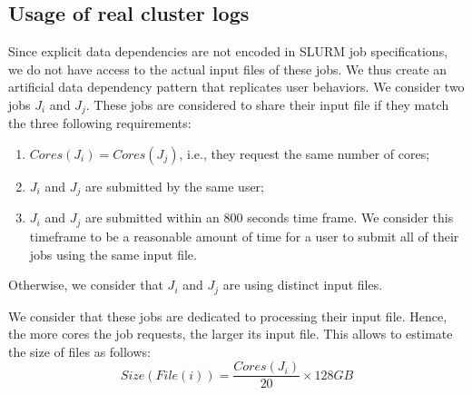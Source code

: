 \documentclass[sigconf,review,anonymous]{acmart}
\newcommand{\rev}[1]{{\color{black}{#1}}}
\newcommand{\file}{\ensuremath{\mathit{File}}\xspace}
\newcommand{\size}{\ensuremath{\mathit{Size}}\xspace}
\newcommand{\core}{\mathit{Cores}\xspace}
\begin{document}
\subsection{Usage of real cluster logs}
\label{sec.working}
\rev{The logs we use contain historical data on jobs, namely their
 exact submission time, their requested walltime, their actual duration, the number of cores they required and the corresponding user's name. 
}
%
Since explicit data dependencies are not encoded in SLURM job
specifications, we do not have access to the actual input files of
these jobs. We thus create an artificial data dependency pattern that
replicates user behaviors.
\rev{Each job uses exactly one input file.}
We consider two jobs $J_i$ and $J_j$. These jobs are considered to
share their input file if they match the three following requirements:
\begin{enumerate}
	\item $\core(J_i) = \core(J_j)$, i.e., they request the same number of cores;
	\item $J_i$ and $J_j$ are submitted by the same user;
	\item $J_i$ and $J_j$ are submitted within an 800 seconds
          time frame. We consider this timeframe to be a reasonable amount of time for a user to submit all of their jobs using the same input file.
\end{enumerate}
Otherwise, we consider that $J_i$ and $J_j$ are using distinct input files. 
\rev{
In theory, two users could share the same file. 
However, because they are using subsets of different databases, it is very unlikely that two
users would work on the same project using the same databases, therefore we ignore this possibility.
}

We consider that these jobs are dedicated to processing their input
file. Hence, the more cores the job requests, 
the larger its input file. This allows to estimate the size of files as follows:
$$\size(\file(i)) =\frac{\core(J_i)}{20} \times 128GB$$
\rev{
For example, if a user need 128GB of memory but would only request 1 of the 20 available cores, that user would block the node for all other users.
Consequently, it is more efficient for a user who need the whole memory of a node to reserve all its cores. 
}
\end{document}
